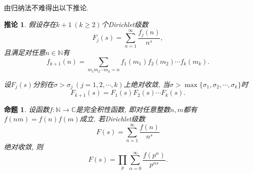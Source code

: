 \documentclass[12pt, a4paper, oneside]{ctexart}
\newtheorem{proposition}{命题}[section]
\newtheorem{corollary}{推论}[section]
\numberwithin{equation}{section}  %
\let\geq=\geqslant %
\def\N{\mathbb{N}}          %
\def\C{\mathbb{C}}          %
\begin{document}
由归纳法不难得出以下推论.
\begin{corollary}
\label{corollary-乘积}
    假设存在$k+1\ (k\geq 2)$个Dirichlet级数
    \begin{equation*}
        F_j(s)=\sum_{n=1}^\infty\frac{f_j(n)}{n^s},
    \end{equation*}
    且满足对任意$n\in \N$有
    \begin{equation*}
        f_{k+1}(n) = \sum_{m_1m_2\cdots m_k=n}f_1(m_1)f_2(m_2)\cdots f_k(m_k).
    \end{equation*}

    设$F_j(s)$分别在$\sigma > \sigma_j\ (j=1,2,\cdots, k)$上绝对收敛, 当$\sigma > \max\{\sigma_1,\sigma_2,\cdots, \sigma_k\}$时
    \begin{equation*}
        F_{k+1}(s) = F_1(s)F_2(s)\cdots F_k(s).
    \end{equation*}
\end{corollary}
\begin{proposition}\label{prop-prod}
    设函数$f:\N\to \C$是完全积性函数, 即对任意整数$n,m$都有$f(nm) = f(n)f(m)$成立. 若Dirichlet级数
    \begin{equation*}
        F(s) = \sum_{n=1}^\infty\frac{f(n)}{n^s}
    \end{equation*}
    绝对收敛, 则
    \begin{equation*}
        F(s) = \prod_{p}\sum_{\alpha =0}^\infty\frac{f(p^\alpha)}{p^{\alpha s}}.
    \end{equation*}
\end{proposition}
\end{document}
